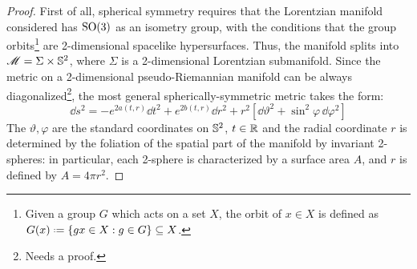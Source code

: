 \begin{proofbox}
  \begin{proof}
    First of all, spherical symmetry requires that the Lorentzian manifold considered has $ \mathrm{SO}(3) $ as an isometry group, with the conditions that the group orbits\footnote{Given a group $ G $ which acts on a set $ X $, the orbit of $ x \in X $ is defined as $ G(x) \defeq \{g x \in X : g \in G\} \ssq X $.} are 2-dimensional spacelike hypersurfaces. Thus, the manifold splits into $ \mathscr{M} = \Sigma \times \mathbb{S}^{2} $, where $ \Sigma $ is a 2-dimensional Lorentzian submanifold. Since the metric on a 2-dimensional pseudo-Riemannian manifold can be always diagonalized\footnote{Needs a proof.}, the most general spherically-symmetric metric takes the form:
    \begin{equation*}
      \dd s^2 = - e^{2a(t,r)} \dd t^2 + e^{2b(t,r)} \dd r^2 + r^2 \left[ \dd \vartheta^2 + \sin^2 \varphi \, \dd \varphi^2 \right]
    \end{equation*}
    The $ \vartheta , \varphi $ are the standard coordinates on $ \mathbb{S}^{2} $, $ t \in \mathbb{R} $ and the radial coordinate $ r $ is determined by the foliation of the spatial part of the manifold by invariant 2-spheres: in particular, each 2-sphere is characterized by a surface area $ A $, and $ r $ is defined by $ A = 4\pi r^2 $.


\end{proof}
\end{proofbox}
